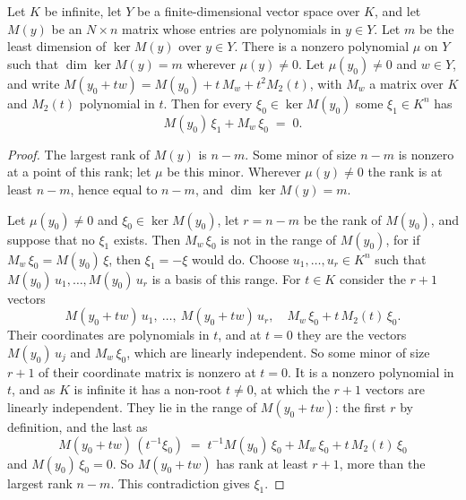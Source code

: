 \begin{lemma}
  \label{lem:pencil-d-kernel-curve}
  \leanok
  Let $K$ be infinite, let $Y$ be a finite-dimensional vector space over
  $K$, and let $M(y)$ be an $N \times n$ matrix whose entries are
  polynomials in $y \in Y$. Let $m$ be the least dimension of
  $\ker M(y)$ over $y \in Y$. There is a nonzero polynomial $\mu$ on $Y$
  such that $\dim \ker M(y) = m$ wherever $\mu(y) \neq 0$. Let
  $\mu(y_0) \neq 0$ and $w \in Y$, and write
  $M(y_0 + tw) = M(y_0) + t\, M_w + t^2 M_2(t)$, with $M_w$ a matrix over
  $K$ and $M_2(t)$ polynomial in $t$. Then for every
  $\xi_0 \in \ker M(y_0)$ some $\xi_1 \in K^n$ has
  \[
    M(y_0)\, \xi_1 + M_w\, \xi_0 \;=\; 0.
  \]
\end{lemma}
\begin{proof}
  \leanok
  The largest rank of $M(y)$ is $n - m$. Some minor of size $n - m$ is
  nonzero at a point of this rank; let $\mu$ be this minor. Wherever
  $\mu(y) \neq 0$ the rank is at least $n - m$, hence equal to $n - m$,
  and $\dim \ker M(y) = m$.

  Let $\mu(y_0) \neq 0$ and $\xi_0 \in \ker M(y_0)$, let $r = n - m$ be
  the rank of $M(y_0)$, and suppose that no $\xi_1$ exists. Then
  $M_w\, \xi_0$ is not in the range of $M(y_0)$, for if
  $M_w\, \xi_0 = M(y_0)\, \xi$, then $\xi_1 = -\xi$ would do. Choose
  $u_1, \dots, u_r \in K^n$ such that $M(y_0)\, u_1, \dots, M(y_0)\, u_r$
  is a basis of this range. For $t \in K$ consider the $r + 1$ vectors
  \[
    M(y_0 + tw)\, u_1,\ \dots,\ M(y_0 + tw)\, u_r,\quad
    M_w\, \xi_0 + t\, M_2(t)\, \xi_0.
  \]
  Their coordinates are polynomials in $t$, and at $t = 0$ they are the
  vectors $M(y_0)\, u_j$ and $M_w\, \xi_0$, which are linearly
  independent. So some minor of size $r + 1$ of their coordinate matrix
  is nonzero at $t = 0$. It is a nonzero polynomial in $t$, and as $K$
  is infinite it has a non-root $t \neq 0$, at which the $r + 1$ vectors
  are linearly independent. They lie in the range of $M(y_0 + tw)$: the
  first $r$ by definition, and the last as
  \[
    M(y_0 + tw)\,(t^{-1} \xi_0) \;=\; t^{-1} M(y_0)\, \xi_0
    + M_w\, \xi_0 + t\, M_2(t)\, \xi_0
  \]
  and $M(y_0)\, \xi_0 = 0$. So $M(y_0 + tw)$ has rank at least $r + 1$,
  more than the largest rank $n - m$. This contradiction gives $\xi_1$.
\end{proof}

